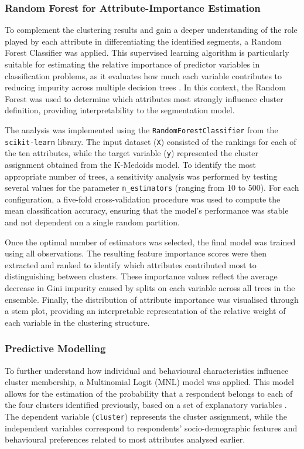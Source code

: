 \documentclass[a4paper, 12pt, twoside]{report}  %
\begin{document}
\subsubsection{Random Forest for Attribute-Importance Estimation}

\indent To complement the clustering results and gain a deeper understanding of the role played by each attribute in differentiating the identified segments, a Random Forest Classifier was applied. This supervised learning algorithm is particularly suitable for estimating the relative importance of predictor variables in classification problems, as it evaluates how much each variable contributes to reducing impurity across multiple decision trees \cite{breiman2001random}. In this context, the Random Forest was used to determine which attributes most strongly influence cluster definition, providing interpretability to the segmentation model.

\indent The analysis was implemented using the \texttt{RandomForestClassifier} from the \texttt{scikit-learn} library. The input dataset (\texttt{X}) consisted of the rankings for each of the ten attributes, while the target variable (\texttt{y}) represented the cluster assignment obtained from the K-Medoids model. To identify the most appropriate number of trees, a sensitivity analysis was performed by testing several values for the parameter \texttt{n\_estimators} (ranging from 10 to 500). For each configuration, a five-fold cross-validation procedure was used to compute the mean classification accuracy, ensuring that the model’s performance was stable and not dependent on a single random partition.

\indent Once the optimal number of estimators was selected, the final model was trained using all observations. The resulting feature importance scores were then extracted and ranked to identify which attributes contributed most to distinguishing between clusters. These importance values reflect the average decrease in Gini impurity caused by splits on each variable across all trees in the ensemble. Finally, the distribution of attribute importance was visualised through a stem plot, providing an interpretable representation of the relative weight of each variable in the clustering structure.

\subsubsection{Predictive Modelling}

\indent To further understand how individual and behavioural characteristics influence cluster membership, a Multinomial Logit (MNL) model was applied. This model allows for the estimation of the probability that a respondent belongs to each of the four clusters identified previously, based on a set of explanatory variables \cite{greene2018econometric}. The dependent variable (\texttt{cluster}) represents the cluster assignment, while the independent variables correspond to respondents’ socio-demographic features and behavioural preferences related to most attributes analysed earlier.
\end{document}
